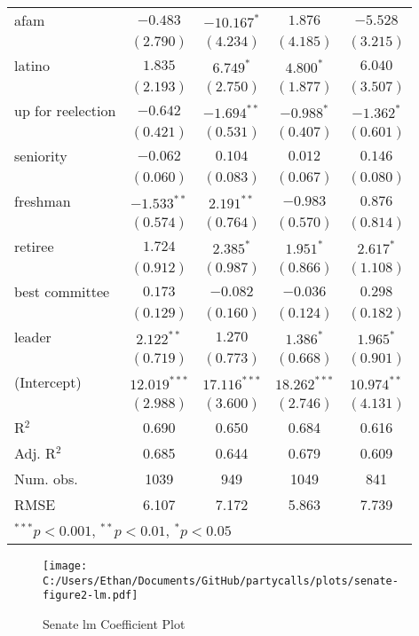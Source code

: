 \documentclass[12pt]{article}
\begin{document}
\begin{table}
\begin{center}
\begin{tabular}{l c c c c }
			afam                   & $-0.483$       & $-10.167^{*}$   & $1.876$        & $-5.528$      \\
			& $(2.790)$      & $(4.234)$       & $(4.185)$      & $(3.215)$     \\
			latino                 & $1.835$        & $6.749^{*}$     & $4.800^{*}$    & $6.040$       \\
			& $(2.193)$      & $(2.750)$       & $(1.877)$      & $(3.507)$     \\
			up for reelection    & $-0.642$       & $-1.694^{**}$   & $-0.988^{*}$   & $-1.362^{*}$  \\
			& $(0.421)$      & $(0.531)$       & $(0.407)$      & $(0.601)$     \\
			seniority              & $-0.062$       & $0.104$         & $0.012$        & $0.146$       \\
			& $(0.060)$      & $(0.083)$       & $(0.067)$      & $(0.080)$     \\
			freshman               & $-1.533^{**}$  & $2.191^{**}$    & $-0.983$       & $0.876$       \\
			& $(0.574)$      & $(0.764)$       & $(0.570)$      & $(0.814)$     \\
			retiree                & $1.724$        & $2.385^{*}$     & $1.951^{*}$    & $2.617^{*}$   \\
			& $(0.912)$      & $(0.987)$       & $(0.866)$      & $(1.108)$     \\
			best committee        & $0.173$        & $-0.082$        & $-0.036$       & $0.298$       \\
			& $(0.129)$      & $(0.160)$       & $(0.124)$      & $(0.182)$     \\
			leader                 & $2.122^{**}$   & $1.270$         & $1.386^{*}$    & $1.965^{*}$   \\
			& $(0.719)$      & $(0.773)$       & $(0.668)$      & $(0.901)$     \\
			(Intercept)            & $12.019^{***}$ & $17.116^{***}$  & $18.262^{***}$ & $10.974^{**}$ \\
			& $(2.988)$      & $(3.600)$       & $(2.746)$      & $(4.131)$     \\
			\hline
			R$^2$                  & 0.690          & 0.650           & 0.684          & 0.616         \\
			Adj. R$^2$             & 0.685          & 0.644           & 0.679          & 0.609         \\
			Num. obs.              & 1039           & 949             & 1049           & 841           \\
			RMSE                   & 6.107          & 7.172           & 5.863          & 7.739         \\
			\hline
			\multicolumn{5}{l}{\scriptsize{$^{***}p<0.001$, $^{**}p<0.01$, $^*p<0.05$}}
		\end{tabular}
	\end{center}
\end{table}

\begin{figure}[h]
	\centering
	\caption{Senate lm Coefficient Plot}
	\texttt{[image: C:/Users/Ethan/Documents/GitHub/partycalls/plots/senate-figure2-lm.pdf]}
\end{figure}
\end{document}
